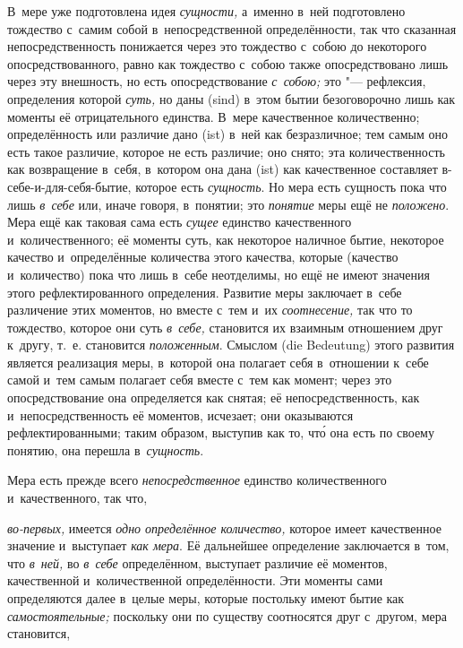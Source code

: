 В~мере уже подготовлена идея {\em сущности,} а~именно в~ней подготовлено
тождество с~самим собой в~непосредственной определённости, так что сказанная
непосредственность понижается через это тождество с~собою до некоторого
опосредствованного, равно как тождество с~собою также опосредствовано лишь
через эту внешность, но есть опосредствование {\em с~собою;} это "---
рефлексия, определения которой {\em суть,} но даны (sind) в~этом бытии
безоговорочно лишь как моменты её отрицательного единства. В~мере качественное
количественно; определённость или различие дано (ist) в~ней как безразличное;
тем самым оно есть такое различие, которое не есть различие; оно снято; эта
количественность как возвращение в~себя, в~котором она дана (ist) как
качественное составляет в-себе-и-для-себя-бытие, которое есть {\em сущность}.
Но мера есть сущность пока что лишь {\em в~себе} или, иначе говоря, в~понятии;
это {\em понятие} меры ещё не {\em положено}. Мера ещё как таковая сама есть
{\em сущее} единство качественного и~количественного; её моменты суть, как
некоторое наличное бытие, некоторое качество и~определённые количества этого
качества, которые (качество и~количество) пока что лишь в~себе неотделимы, но
ещё не имеют значения этого рефлектированного определения. Развитие меры
заключает в~себе различение этих моментов, но вместе с~тем и~их
{\em соотнесение,} так что то тождество, которое они суть {\em в~себе,}
становится их взаимным отношением друг к~другу, т.~е. становится
{\em положенным}. Смыслом (die Bedeutung) этого развития является реализация
меры, в~которой она полагает себя в~отношении к~себе самой и~тем самым полагает
себя вместе с~тем как момент; через это опосредствование она определяется как
снятая; её непосредственность, как и~непосредственность её моментов, исчезает;
они оказываются рефлектированными; таким образом, выступив как то, чт\'{о} она
есть по своему понятию, она перешла в~{\em сущность}.

Мера есть прежде всего {\em непосредственное} единство количественного
и~качественного, так что,

{\em во-первых,} имеется {\em одно определённое количество,} которое имеет
качественное значение и~выступает {\em как мера}. Её дальнейшее определение
заключается в~том, что {\em в~ней,} во {\em в~себе} определённом, выступает
различие её моментов, качественной и~количественной определённости. Эти моменты
сами определяются далее в~целые меры, которые постольку имеют бытие как
{\em самостоятельные;} поскольку они по существу соотносятся друг с~другом,
мера становится,

